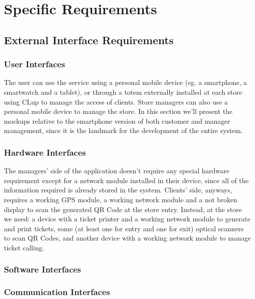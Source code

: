 \documentclass{article}
\begin{document}
\section{Specific Requirements}

	\subsection{External Interface Requirements}
	
		\subsubsection{User Interfaces}
		
			The user can use the service using a personal mobile device (eg. a smartphone, a smartwatch and a tablet), or through a totem externally installed at each store using CLup to manage the access of clients. Store managers can also use a personal mobile device to manage the store. In this section we’ll present the mockups relative to the smartphone version of both customer and manager management, since it is the landmark for the development of the entire system.
		
		\subsubsection{Hardware Interfaces}
		
			The managers’ side of the application doesn’t require any special hardware requirement except for a network module installed in their device, since all of the information required is already stored in the system. Clients’ side, anyways, requires a working GPS module, a working network module and a not broken display to scan the generated QR Code at the store entry. Instead, at the store we need: a device with a ticket printer and a working network module to generate and print tickets, some (at least one for entry and one for exit) optical scanners to scan QR Codes, and another device with a working network module to manage ticket calling.
			
			
		\subsubsection{Software Interfaces}
		
			
		\subsubsection{Communication Interfaces}
		
\end{document}
